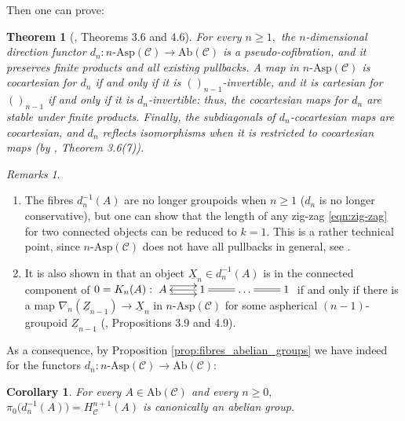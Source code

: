 \documentclass[11pt]{amsart}
\theoremstyle{plain}
\newtheorem{theorem}[subsubsection]{Theorem}
\newtheorem{corollary}[subsubsection]{Corollary}
\theoremstyle{definition}
\theoremstyle{remark}
\newtheorem{remarks}[subsubsection]{Remarks}
\begin{document}
Then one can prove:
\begin{theorem}[\cite{bourn-rodelo}, Theorems 3.6 and 4.6]
For every $n\geq 1,$ the $n$-dimensional direction functor $d_n\colon n\text{-}\mathrm{Asp}(\mathcal{C})\rightarrow\mathrm{Ab}(\mathcal{C})$ is a pseudo-cofibration, and it preserves finite products and all existing pullbacks. A map in $n\text{-}\mathrm{Asp}(\mathcal{C})$ is cocartesian for $d_n$ if and only if it is $()_{n-1}$-invertible, and it is cartesian for $()_{n-1}$ if and only if it is $d_n$-invertible: thus, the cocartesian maps for $d_n$ are stable under finite products. Finally, the subdiagonals of $d_n$-cocartesian maps are cocartesian, and $d_n$ reflects isomorphisms when it is restricted to cocartesian maps (by \cite{bourn-rodelo}, Theorem 3.6(7)).
\end{theorem}
\begin{remarks}
\begin{enumerate}
\item The fibres $d_n^{-1}(A)$ are no longer groupoids when $n\geq 1$ ($d_n$ is no longer conservative), but one can show that the length of any zig-zag \eqref{eqn:zig-zag} for two connected objects can be reduced to $k=1.$ This is a rather technical point, since $n\text{-}\mathrm{Asp}(\mathcal{C})$ does not have all pullbacks in general, see \cite{bourn-rodelo}.
\item It is also shown in \cite{bourn-rodelo} that an object $\underline{X}_n\in d_n^{-1}(A)$ is in the connected component of $0=K_n(A):\xymatrix{{A} \ar@<.9ex>[r] \ar@<-.9ex>[r] &{1}\ar[l] \ar@{=}[r] &{\dots} \ar@{=}[r] &{1}}$ if and only if there is a map $\nabla_n(\underline{Z}_{n-1})\rightarrow\underline{X}_n$ in $n\text{-}\mathrm{Asp}(\mathcal{C})$ for some aspherical $(n-1)$-groupoid $\underline{Z}_{n-1}$ (\cite{bourn-rodelo}, Propositions 3.9 and 4.9).
\end{enumerate}
\end{remarks}
As a consequence, by Proposition \ref{prop:fibres_abelian_groups} we have indeed for the functors $d_n\colon n\text{-}\mathrm{Asp}(\mathcal{C})\rightarrow\mathrm{Ab}(\mathcal{C})$:
\begin{corollary}
\label{cor:connected_components_group}
For every $A\in\mathrm{Ab}(\mathcal{C})$ and every $n\geq 0,$ $\pi_0\big(d_n^{-1}(A)\big)=H^{n+1}_{\mathcal{C}}(A)$ is canonically an abelian group.
\end{corollary}
\end{document}
